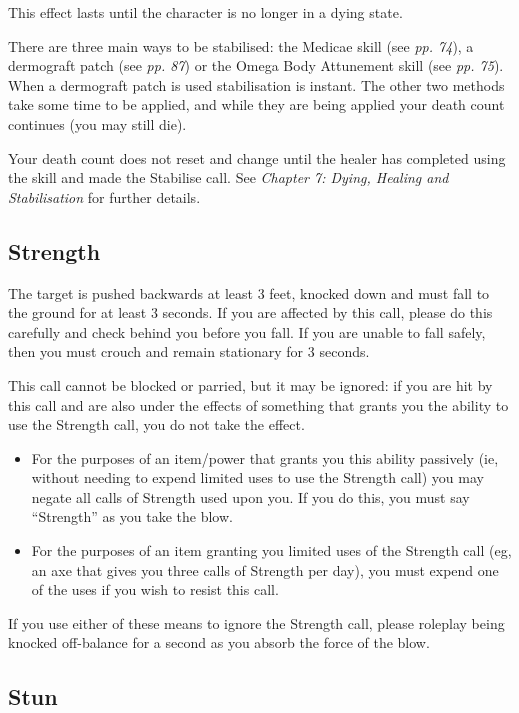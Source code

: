 This effect lasts until the character is no longer in a dying state.

There are three main ways to be stabilised: the Medicae skill (see \textit{pp. 74}), a dermograft patch (see \textit{pp. 87}) or the Omega Body Attunement skill (see \textit{pp. 75}). When a dermograft patch is used stabilisation is instant. The other two methods take some time to be applied, and while they are being applied your death count continues (you may still die).

Your death count does not reset and change until the healer has completed using the skill and made the Stabilise call. See \textit{Chapter 7: Dying, Healing and Stabilisation} for further details.

\subsection{Strength}

The target is pushed backwards at least 3 feet, knocked down and must fall to the ground for at least 3 seconds. If you are affected by this call, please do this carefully and check behind you before you fall. If you are unable to fall safely, then you must crouch and remain stationary for 3 seconds.

This call cannot be blocked or parried, but it may be ignored: if you are hit by this call and are also under the effects of something that grants you the ability to use the Strength call, you do not take the effect.

\begin{itemize}
\item For the purposes of an item/power that grants you this ability passively (ie, without needing to expend limited uses to use the Strength call) you may negate all calls of Strength used upon you. If you do this, you must say ``Strength'' as you take the blow.

\item For the purposes of an item granting you limited uses of the Strength call (eg, an axe that gives you three calls of Strength per day), you must expend one of the uses if you wish to resist this call.

\end{itemize}
If you use either of these means to ignore the Strength call, please roleplay being knocked off-balance for a second as you absorb the force of the blow.

\subsection{Stun}

